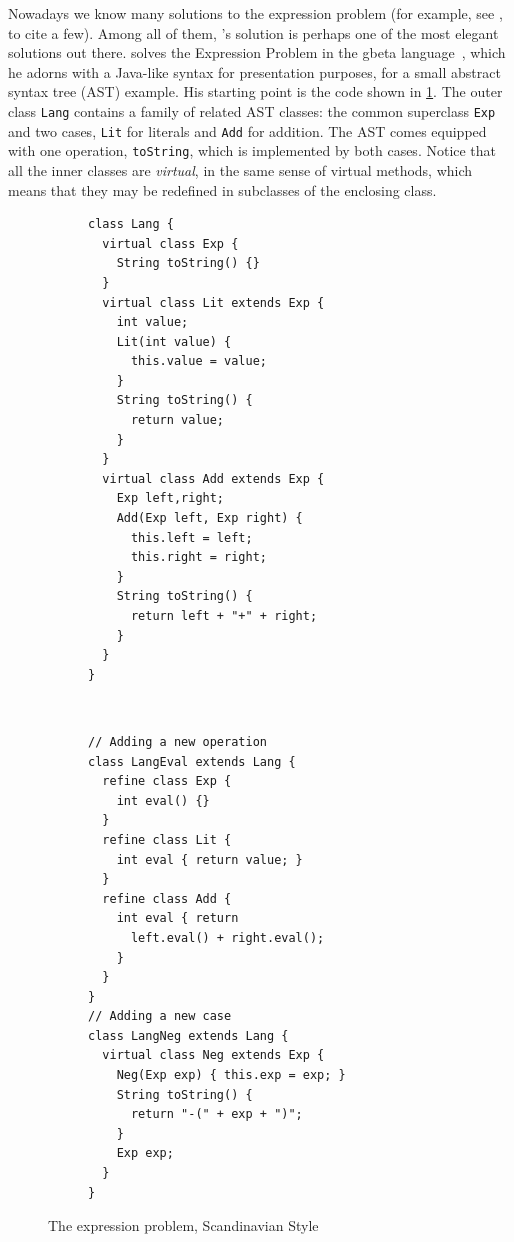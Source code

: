 Nowadays we know many solutions to the expression problem (for example, see
\citet{oliveira2012extensibility, wang2016expression, oliveira09modular,
  swierstra_2008, Zenger-Odersky2005}, to cite a few). Among all of them,
\citeauthor{ernst2004expression}'s solution is perhaps one of the most elegant
solutions out there. \citeauthor{ernst2004expression} solves the Expression
Problem in the \textsf{gbeta} language~\citep{ernst2000gbeta}, which he adorns with a Java-like syntax for
presentation purposes, for a small abstract syntax tree (AST) example. His
starting point is the code shown in \cref{fig:lang}. The outer class
\lstinline{Lang} contains a family of related AST classes: the common superclass
\lstinline{Exp} and two cases, \lstinline{Lit} for literals and \lstinline{Add}
for addition. The AST comes equipped with one operation, \lstinline{toString},
which is implemented by both cases. Notice that all the inner classes are
\textit{virtual}, in the same sense of virtual methods, which means that they
may be redefined in subclasses of the enclosing class.


\begin{figure}[t]
    \centering
    \begin{subfigure}[b]{0.45\textwidth}
\begin{lstlisting}[language=gbeta]
class Lang {
  virtual class Exp {
    String toString() {}
  }
  virtual class Lit extends Exp {
    int value;
    Lit(int value) {
      this.value = value;
    }
    String toString() {
      return value;
    }
  }
  virtual class Add extends Exp {
    Exp left,right;
    Add(Exp left, Exp right) {
      this.left = left;
      this.right = right;
    }
    String toString() {
      return left + "+" + right;
    }
  }
}
\end{lstlisting}
 \label{fig:lang}
    \end{subfigure} ~
    \begin{subfigure}[b]{0.5\textwidth}
\begin{lstlisting}[language=gbeta,  xleftmargin=1mm]
// Adding a new operation
class LangEval extends Lang {
  refine class Exp {
    int eval() {}
  }
  refine class Lit {
    int eval { return value; }
  }
  refine class Add {
    int eval { return
      left.eval() + right.eval();
    }
  }
}
// Adding a new case
class LangNeg extends Lang {
  virtual class Neg extends Exp {
    Neg(Exp exp) { this.exp = exp; }
    String toString() {
      return "-(" + exp + ")";
    }
    Exp exp;
  }
}
\end{lstlisting}
 \label{fig:extend}
    \end{subfigure}
    \caption{The expression problem, Scandinavian Style}
\end{figure}

